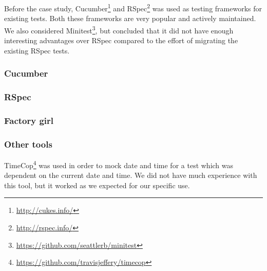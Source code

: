 
Before the case study, Cucumber\footnote{\url{http://cukes.info/}} and
RSpec\footnote{\url{http://rspec.info/}} was used as testing frameworks
for existing tests. Both these frameworks are very popular and actively
maintained. We also considered
Minitest\footnote{\url{https://github.com/seattlerb/minitest}}, but
concluded that it did not have enough interesting advantages over RSpec
compared to the effort of migrating the existing RSpec tests.\\

\subsubsection{Cucumber}


\subsubsection{RSpec}


\subsubsection{Factory girl}


\subsubsection{Other tools}

TimeCop\footnote{\url{https://github.com/travisjeffery/timecop}} was
used in order to mock date and time for a test which was dependent on
the current date and time. We did not have much experience with this
tool, but it worked as we expected for our specific use.\\
